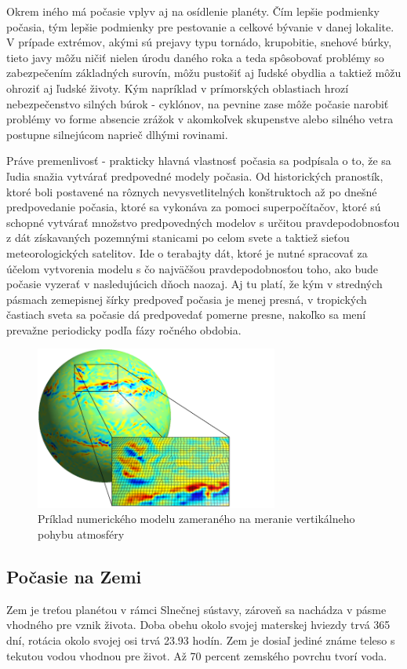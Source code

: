 Okrem iného má počasie vplyv aj na osídlenie planéty. Čím lepšie podmienky počasia, tým lepšie podmienky pre pestovanie a celkové bývanie v danej lokalite. V prípade extrémov, akými sú prejavy typu tornádo, krupobitie, snehové búrky, tieto javy môžu ničiť nielen úrodu daného roka a teda spôsobovať problémy so zabezpečením základných surovín, môžu pustošiť aj ľudské obydlia a taktiež môžu ohroziť aj ľudské životy. Kým napríklad v prímorských oblastiach hrozí nebezpečenstvo silných búrok - cyklónov, na pevnine zase môže počasie narobiť problémy vo forme absencie zrážok v akomkoľvek skupenstve alebo silného vetra postupne silnejúcom naprieč dlhými rovinami.

Práve premenlivosť - prakticky hlavná vlastnosť počasia sa podpísala o to, že sa ľudia snažia vytvárať predpovedné modely počasia. Od historických pranostík, ktoré boli postavené na rôznych nevysvetlitelných konštruktoch až po dnešné predpovedanie počasia, ktoré sa vykonáva za pomoci superpočítačov, ktoré sú schopné vytvárať množstvo predpovedných modelov s určitou pravdepodobnosťou z dát získavaných pozemnými stanicami po celom svete a taktiež sieťou meteorologických satelitov. Ide o terabajty dát, ktoré je nutné spracovať za účelom vytvorenia modelu s čo najväčšou pravdepodobnosťou toho, ako bude počasie vyzerať v nasledujúcich dňoch naozaj. Aj tu platí, že kým v stredných pásmach zemepisnej šírky predpoveď počasia je menej presná, v tropických častiach sveta sa počasie dá predpovedať pomerne presne, nakoľko sa mení prevažne periodicky podľa fázy ročného obdobia.

\begin{figure}[!htbp]
  \centering
  \includegraphics[width=8cm]{img/numerical_prediction_model.png}
  \caption{Príklad numerického modelu zameraného na meranie vertikálneho pohybu atmosféry}
  \label{numModel}
\end{figure}

\subsection{Počasie na Zemi}
Zem je treťou planétou v rámci Slnečnej sústavy, zároveň sa nachádza v pásme vhodného pre vznik života. Doba obehu okolo svojej materskej hviezdy trvá 365 dní, rotácia okolo svojej osi trvá 23.93 hodín. Zem je dosiaľ jediné známe teleso s tekutou vodou vhodnou pre život. Až 70 percent zemského povrchu tvorí voda.

